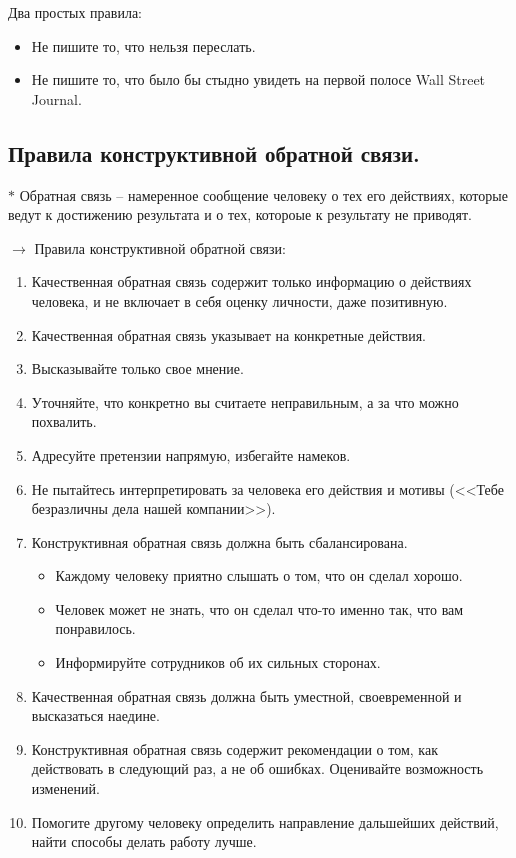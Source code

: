 \documentclass[12pt,a4paper]{report}
\begin{document}
\bigskip 
Два простых правила: 
\begin{itemize}
	\item[\checkmark] Не пишите то, что нельзя переслать. 
	\item[\checkmark] Не пишите то, что было бы стыдно увидеть на первой полосе Wall Street Journal.
\end{itemize}

\subsection*{Правила конструктивной обратной связи.}
$\ast$ Обратная связь -- намеренное сообщение человеку о тех его действиях, которые ведут к достижению результата и о тех, котороые к результату не приводят.

\bigskip\smallskip
$\rightarrow$ Правила конструктивной обратной связи:

\begin{enumerate}
	\item Качественная обратная связь содержит только информацию о действиях человека, и не включает в себя оценку личности, даже позитивную.
	
	\item Качественная обратная связь указывает на конкретные действия.
	
	\item Высказывайте только свое мнение.
	
	\item Уточняйте, что конкретно вы считаете неправильным, а за что можно похвалить.
	
	\item Адресуйте претензии напрямую, избегайте намеков.
	
	\item Не пытайтесь интерпретировать за человека его действия и мотивы (<<Тебе безразличны дела нашей компании>>).
	
	\item Конструктивная обратная связь должна быть сбалансирована.
	
	\begin{itemize}
		\item Каждому человеку приятно слышать о том, что он сделал хорошо.
		
		\item Человек может не знать, что он сделал что-то именно так, что вам понравилось.
		
		\item Информируйте сотрудников об их сильных сторонах.
	\end{itemize}

	\item Качественная обратная связь должна быть уместной, своевременной и высказаться наедине.
	
	\item Конструктивная обратная связь содержит рекомендации о том, как действовать в следующий раз, а не об ошибках. Оценивайте возможность изменений.
	
	\item Помогите другому человеку определить направление дальшейших действий, найти способы делать работу лучше.	
\end{enumerate}
\end{document}
